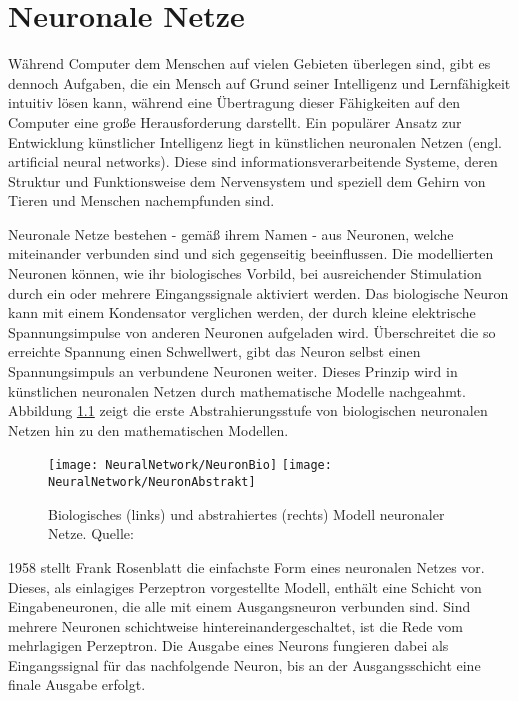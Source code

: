%
%

\chapter{Neuronale Netze}

Während Computer dem Menschen auf vielen Gebieten überlegen sind, gibt es dennoch Aufgaben, die ein Mensch auf Grund seiner Intelligenz und Lernfähigkeit intuitiv lösen kann, während eine Übertragung dieser  Fähigkeiten auf den Computer eine große Herausforderung darstellt. Ein populärer Ansatz zur Entwicklung  künstlicher Intelligenz liegt in künstlichen neuronalen Netzen (engl. artificial neural networks). Diese sind  \glqq informationsverarbeitende Systeme, deren Struktur und Funktionsweise dem Nervensystem und  speziell dem Gehirn von Tieren und Menschen nachempfunden sind\grqq.\cite{Kruse:2015}

Neuronale Netze bestehen - gemäß ihrem Namen - aus Neuronen, welche miteinander verbunden sind und sich gegenseitig beeinflussen. Die modellierten Neuronen können, wie ihr biologisches Vorbild, bei ausreichender Stimulation durch ein oder mehrere Eingangssignale aktiviert werden. Das biologische 
Neuron kann mit einem Kondensator verglichen werden, der durch kleine elektrische Spannungsimpulse 
von anderen Neuronen aufgeladen wird. Überschreitet die so erreichte Spannung einen Schwellwert, 
gibt das Neuron selbst einen Spannungsimpuls an verbundene Neuronen weiter. Dieses Prinzip wird in 
künstlichen neuronalen Netzen durch mathematische Modelle nachgeahmt. Abbildung \ref{NNBio} zeigt 
die erste Abstrahierungsstufe von biologischen neuronalen Netzen hin zu den mathematischen Modellen. 
\cite{Ertel:2016}

\begin{figure}[H]
	\begin{center}
		\texttt{[image: NeuralNetwork/NeuronBio]}
		\texttt{[image: NeuralNetwork/NeuronAbstrakt]}
		\caption{Biologisches (links) und abstrahiertes (rechts) Modell neuronaler Netze. Quelle:\cite{Ertel:2016}} 
		\label{NNBio}
	\end{center}
\end{figure}

1958 stellt Frank Rosenblatt die einfachste Form eines neuronalen Netzes vor. Dieses, als
einlagiges Perzeptron vorgestellte Modell, enthält eine Schicht von Eingabeneuronen, die
alle mit einem Ausgangsneuron verbunden sind. \cite{Dorn:2018} Sind mehrere Neuronen schichtweise 
hintereinandergeschaltet, ist die Rede vom mehrlagigen Perzeptron. Die Ausgabe
eines Neurons fungieren dabei als Eingangssignal für das nachfolgende Neuron, bis an
der Ausgangsschicht eine finale Ausgabe erfolgt.


